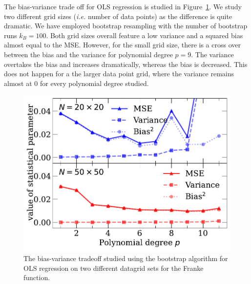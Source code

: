 \documentclass[a4paper, 
amsfonts, 
amssymb, 
amsmath, 
reprint, 
showkeys, 
nofootinbib, 
twoside]{revtex4-2}
\begin{document}
The bias-variance trade off for OLS regression is studied in Figure~\ref{fig:ols_bivar}. We study two different grid sizes (\textit{i.e.} number of data points) as the difference is quite dramatic. We have employed bootstrap resampling with the number of bootstrap runs $k_B = 100$. Both grid sizes overall feature a low variance and a squared bias almost equal to the MSE. However, for the small grid size, there is a cross over between the bias and the variance for polynomial degree $p = 9$. The variance overtakes the bias and increases dramatically, whereas the bias is decreased. This does not happen for a the larger data point grid, where the variance remains almost at 0 for every polynomial degree studied. 

\begin{figure} [h!]
    \centering
    \includegraphics[width = \columnwidth]{Figures/ols_bias_var.pdf}
    \caption{The bias-variance tradeoff studied using the bootstrap algorithm for OLS regression on two different datagrid sets for the Franke function.}
    \label{fig:ols_bivar}
\end{figure}
\end{document}
